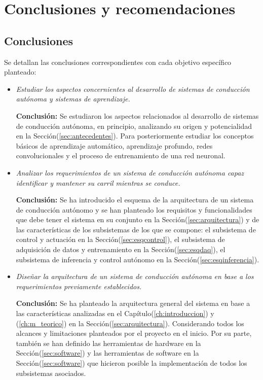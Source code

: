 \chapter{Conclusiones y recomendaciones}
\label{ch:conclusiones}
\section{Conclusiones}
Se detallan las conclusiones correspondientes con cada objetivo específico planteado:

\begin{itemize}

    \item \textit{Estudiar los aspectos concernientes al desarrollo de sistemas de conducción autónoma y sistemas de aprendizaje.}
    
    \textbf{Conclusión:} Se estudiaron los aspectos relacionados al desarrollo de sistemas de conducción autónoma, en principio, 
    analizando su origen y potencialidad en la Sección(\ref{sec:antecedentes}). Para posteriormente estudiar los conceptos básicos 
    de aprendizaje 
    automático, aprendizaje profundo, redes convolucionales y el proceso de entrenamiento de una red neuronal.

    \item \textit{Analizar los requerimientos de un sistema de conducción autónoma capaz identificar y mantener su carril 
    mientras se conduce.}

    \textbf{Conclusión:} Se ha introducido el esquema de la arquitectura de un sistema de conducción autónomo y se han planteado 
    los requisitos y funcionalidades que debe tener el sistema en su conjunto en la Sección(\ref{sec:arquitectura}) y de las 
    características de los 
    subsistemas de los que se compone: el subsistema de control y actuación en la Sección(\ref{sec:esqcontrol}), el subsistema de adquisición de 
    datos y entrenamiento en la Sección(\ref{sec:esqdaq}), el subsistema de inferencia y control autónomo en la Sección(\ref{sec:esqinferencia}). 

    \item \textit{Diseñar la arquitectura de un sistema de conducción autónoma en base a los requerimientos previamente 
    establecidos.}

    \textbf{Conclusión:} Se ha planteado la arquitectura general del sistema en base a las características analizadas en 
    el Capítulo(\ref{ch:introduccion}) y (\ref{ch:m_teorico}) en la Sección(\ref{sec:arquitectura}). Considerando todos los alcances
    y limitaciones planteados por el proyecto en el inicio. 
    Por su parte, también se han definido las herramientas de hardware en la Sección(\ref{sec:software}) y las herramientas 
    de software en 
    la Sección(\ref{sec:software}) que hicieron posible la implementación de todos los subsistemas asociados.


\end{itemize}
